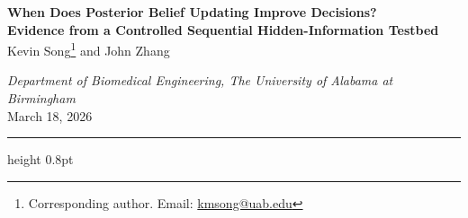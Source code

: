 \documentclass[12pt]{article}
\begin{document}
\singlespacing

\begin{center}
  {\LARGE\bfseries
    When Does Posterior Belief Updating Improve Decisions?\\[6pt]
    Evidence from a Controlled Sequential Hidden-Information Testbed}\\[14pt]

  \renewcommand{\thefootnote}{\fnsymbol{footnote}}
  {\large Kevin Song\footnote{Corresponding author.
    Email: \href{mailto:kmsong@uab.edu}{kmsong@uab.edu}}
    \quad and \quad John Zhang}\\[6pt]
  \renewcommand{\thefootnote}{\arabic{footnote}}

  {\normalsize\itshape
    Department of Biomedical Engineering,
    The University of Alabama at Birmingham}\\[6pt]

  {\small March 18, 2026}\\[14pt]
\end{center}

\hrule height 0.8pt
\vspace{8pt}
\end{document}
